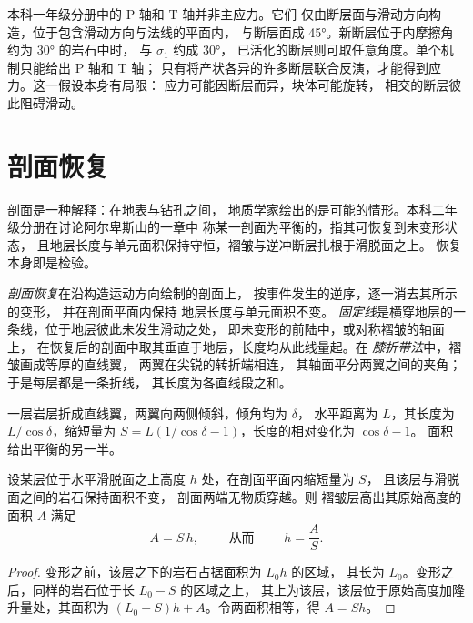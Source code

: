 本科一年级分册中的 P 轴和 T 轴并非主应力。它们
仅由断层面与滑动方向构造，位于包含滑动方向与法线的平面内，
与断层面成 \ang{45}。新断层位于内摩擦角约为 \ang{30} 的岩石中时，
与 $\sigma_1$ 约成 \ang{30}，
已活化的断层则可取任意角度。单个机制只能给出 P 轴和 T 轴；
只有将产状各异的许多断层联合反演，才能得到应力。这一假设本身有局限：
应力可能因断层而异，块体可能旋转，
相交的断层彼此阻碍滑动。

\section{剖面恢复}\label{sec:b3:structural-analysis:restoration}

剖面是一种解释：在地表与钻孔之间，
地质学家绘出的是可能的情形。本科二年级分册在讨论阿尔卑斯山的一章中
称某一剖面为平衡的，指其可恢复到未变形状态，
且地层长度与单元面积保持守恒，褶皱与逆冲断层扎根于滑脱面之上。
恢复本身即是检验。

\begin{definition}\label{def:b3:structural-analysis:restoration}
\emph{剖面恢复}在沿构造运动方向绘制的剖面上，
按事件发生的逆序，逐一消去其所示的变形，
并在剖面平面内保持
地层长度与单元面积不变。
\emph{固定线}是横穿地层的一条线，位于地层彼此未发生滑动之处，
即未变形的前陆中，或对称褶皱的轴面上，
在恢复后的剖面中取其垂直于地层，长度均从此线量起。在
\emph{膝折带法}中，褶皱画成等厚的直线翼，
两翼在尖锐的转折端相连，
其轴面平分两翼之间的夹角；
于是每层都是一条折线，
其长度为各直线段之和。
\end{definition}

一层岩层折成直线翼，两翼向两侧倾斜，倾角均为 $\delta$，
水平距离为 $L$，其长度为 $L/\cos\delta$，缩短量为
$S = L(1/\cos\delta - 1)$，长度的相对变化为 $\cos\delta - 1$。
面积给出平衡的另一半。

\begin{proposition}[至滑脱面的深度]\label{prop:b3:structural-analysis:detachment}
设某层位于水平滑脱面之上高度 $h$ 处，在剖面平面内缩短量为 $S$，
且该层与滑脱面之间的岩石保持面积不变，
剖面两端无物质穿越。则
褶皱层高出其原始高度的面积 $A$ 满足
\[
  A = S\,h , \qquad\text{ 从而 }\qquad h = \frac AS .
\]
\end{proposition}

\begin{proof}
变形之前，该层之下的岩石占据面积为 $L_0 h$ 的区域，
其长为 $L_0$。变形之后，同样的岩石位于长 $L_0 - S$ 的区域之上，
其上为该层，该层位于原始高度加隆升量处，其面积为
$(L_0 - S)h + A$。令两面积相等，得 $A = Sh$。
\end{proof}


